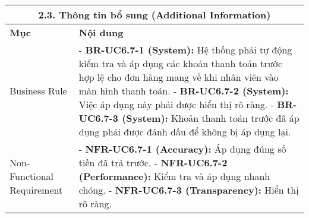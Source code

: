 \begin{longtable}{|m{4cm}|p{11cm}|}
\hline
\multicolumn{2}{|c|}{\textbf{2.3. Thông tin bổ sung (Additional Information)}} \\
\hline
\textbf{Mục} & \textbf{Nội dung} \\
\hline
Business Rule & - \textbf{BR-UC6.7-1 (System):} Hệ thống phải tự động kiểm tra và áp dụng các khoản thanh toán trước hợp lệ cho đơn hàng mang về khi nhân viên vào màn hình thanh toán. \newline - \textbf{BR-UC6.7-2 (System):} Việc áp dụng này phải được hiển thị rõ ràng. \newline - \textbf{BR-UC6.7-3 (System):} Khoản thanh toán trước đã áp dụng phải được đánh dấu để không bị áp dụng lại. \\
\hline
Non-Functional Requirement & - \textbf{NFR-UC6.7-1 (Accuracy):} Áp dụng đúng số tiền đã trả trước. \newline - \textbf{NFR-UC6.7-2 (Performance):} Kiểm tra và áp dụng nhanh chóng. \newline - \textbf{NFR-UC6.7-3 (Transparency):} Hiển thị rõ ràng. \\
\hline
\end{longtable}

